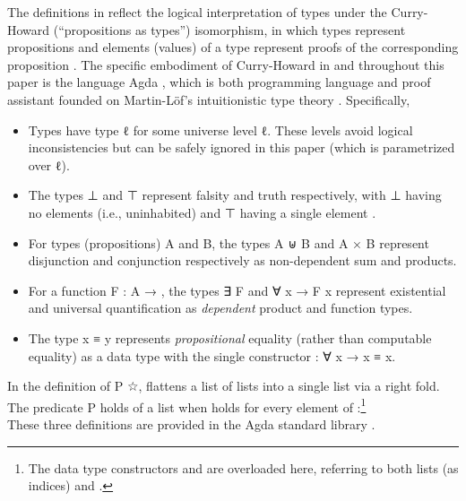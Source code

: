 \documentclass[acmsmall,screen,timestamp]{acmart}  %
\begin{document}
The definitions in  reflect the logical interpretation of types under the Curry-Howard (``propositions as types'') isomorphism, in which types represent propositions and elements (values) of a type represent proofs of the corresponding proposition \citep{Wadler2015propositions}.
The specific embodiment of Curry-Howard in  and throughout this paper is the language Agda \citep{Norell2008AFP, BoveEtAl2009Agda}, which is both programming language and proof assistant founded on Martin-Löf's intuitionistic type theory \citep{MartinLöf1984intuitionistic}.
Specifically,
\begin{itemize}

\item Types have type { \AB ℓ} for some universe level \AB ℓ.
These levels avoid logical inconsistencies but can be safely ignored in this paper (which is parametrized over \AB ℓ).

\item The types \AD ⊥ and \ARe ⊤ represent falsity and truth respectively, with \AD ⊥ having no elements (i.e., uninhabited) and \ARe ⊤ having a single element .

\item For types (propositions) \AB A and \AB B, the types {\AB A \AD ⊎ \AB B} and {\AB A \ARe × \AB B} represent disjunction and conjunction respectively as non-dependent sum and products.

\item For a function {\AB F \AS : \AB A \AS →  }, the types {\AF ∃ \AB F}  and {\AF ∀ \AB x \AS → \AB F \AB x} represent existential and universal quantification as \emph{dependent} product and function types.

\item The type {\AB x \AD ≡ \AB y} represents \emph{propositional} equality (rather than computable equality) as a data type with the single constructor { \AS : \AS ∀ \AB x \AS → \AB x \AD ≡ \AB x}.

\end{itemize}

In the definition of {\AB P \AF ☆},  flattens a list of lists into a single list via a right fold.
The predicate { \AB P} holds of a list  when  holds for every element of :\footnote{The data type constructors \AIC{[]} and  are overloaded here, referring to both lists (as indices) and .}\\
\vspace{-1ex}
These three definitions are provided in the Agda standard library \citep{agda-stdlib}.
\end{document}
